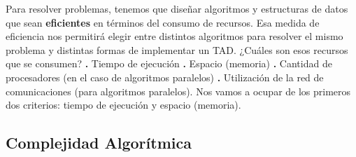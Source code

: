 \documentclass[10pt,a4paper]{article}
\begin{document}
Para resolver problemas, tenemos que diseñar algoritmos y estructuras de datos que sean \textbf{eficientes}  en términos del consumo de recursos.
\newline
\newline
Esa medida de eficiencia nos permitirá elegir entre distintos algoritmos para resolver el mismo problema y distintas formas de implementar un TAD. 
\newline
\newline
¿Cuáles son esos recursos que se consumen?
\newline
\newline
\textbf{.} Tiempo de ejecución
\newline
\newline
\textbf{.} Espacio (memoria)
\newline
\newline
\textbf{.} Cantidad de procesadores (en el caso de algoritmos paralelos)
\newline
\newline
\textbf{.} Utilización de la red de comunicaciones (para algoritmos paralelos).
\newline
\newline
Nos vamos a ocupar de los primeros dos criterios: tiempo de ejecución y espacio (memoria).

\subsection{Complejidad Algorítmica}
\end{document}
